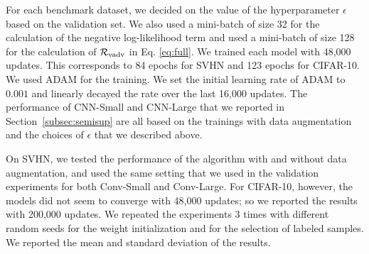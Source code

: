 \documentclass[10pt,journal,compsoc]{IEEEtran}
\begin{document}
For each benchmark dataset, we decided on the value of the hyperparameter $\epsilon$ based on the validation set. 
We also used a mini-batch of size 32 for the calculation of the negative log-likelihood term and used a mini-batch of size 128 for the calculation of $\mathcal{R}_{\rm vadv}$ in Eq. \eqref{eq:full}. We trained each model with 
48,000 updates. This corresponds to 84 epochs for SVHN and 123 epochs for CIFAR-10. 
We used ADAM for the training. We set the initial learning rate of ADAM to $0.001$ and linearly decayed the rate over the last 16,000 updates. The performance of CNN-Small and CNN-Large that we reported in Section~\ref{subsec:semisup} are all based on the trainings with data augmentation and the choices of $\epsilon$ that we described above.

On SVHN, we tested the performance of the algorithm with and without data augmentation, and used the same setting that we used in the validation experiments for both Conv-Small and Conv-Large. 
For CIFAR-10, however, the models did not seem to converge with 48,000 updates; so we reported the results with 200,000 updates.  
We repeated the experiments 3 times with different random seeds for the weight initialization and for the selection of labeled samples. We reported the mean and standard deviation of the results.

\vskip 0.2in
\end{document}
